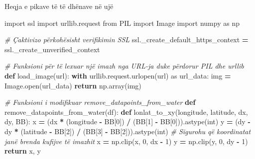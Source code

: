 \documentclass[
  ignorenonframetext,
]{beamer}
\newenvironment{Shaded}{\begin{snugshade}}{\end{snugshade}}
\newcommand{\BuiltInTok}[1]{#1}
\newcommand{\CommentTok}[1]{\textcolor[rgb]{0.56,0.35,0.01}{\textit{#1}}}
\newcommand{\ControlFlowTok}[1]{\textcolor[rgb]{0.13,0.29,0.53}{\textbf{#1}}}
\newcommand{\DecValTok}[1]{\textcolor[rgb]{0.00,0.00,0.81}{#1}}
\newcommand{\ImportTok}[1]{#1}
\newcommand{\KeywordTok}[1]{\textcolor[rgb]{0.13,0.29,0.53}{\textbf{#1}}}
\newcommand{\NormalTok}[1]{#1}
\newcommand{\OperatorTok}[1]{\textcolor[rgb]{0.81,0.36,0.00}{\textbf{#1}}}
\begin{document}
\begin{frame}[fragile]{Heqja e pikave të të dhënave në ujë}
\protect\hypertarget{heqja-e-pikave-tuxeb-tuxeb-dhuxebnave-nuxeb-ujuxeb-9}{}

\begin{Shaded}
\begin{Highlighting}[]
\ImportTok{import}\NormalTok{ ssl}
\ImportTok{import}\NormalTok{ urllib.request}
\ImportTok{from}\NormalTok{ PIL }\ImportTok{import}\NormalTok{ Image}
\ImportTok{import}\NormalTok{ numpy }\ImportTok{as}\NormalTok{ np}

\CommentTok{\# Çaktivizo përkohësisht verifikimin SSL}
\NormalTok{ssl.\_create\_default\_https\_context }\OperatorTok{=}\NormalTok{ ssl.\_create\_unverified\_context}

\CommentTok{\# Funksioni për të lexuar një imazh nga URL{-}ja duke përdorur PIL dhe urllib}
\KeywordTok{def}\NormalTok{ load\_image(url):}
    \ControlFlowTok{with}\NormalTok{ urllib.request.urlopen(url) }\ImportTok{as}\NormalTok{ url\_data:}
\NormalTok{        img }\OperatorTok{=}\NormalTok{ Image.}\BuiltInTok{open}\NormalTok{(url\_data)}
        \ControlFlowTok{return}\NormalTok{ np.array(img)}

\CommentTok{\# Funksioni i modifikuar remove\_datapoints\_from\_water}
\KeywordTok{def}\NormalTok{ remove\_datapoints\_from\_water(df):}
    \KeywordTok{def}\NormalTok{ lonlat\_to\_xy(longitude, latitude, dx, dy, BB):}
\NormalTok{        x }\OperatorTok{=}\NormalTok{ (dx }\OperatorTok{*}\NormalTok{ (longitude }\OperatorTok{{-}}\NormalTok{ BB[}\DecValTok{0}\NormalTok{]) }\OperatorTok{/}\NormalTok{ (BB[}\DecValTok{1}\NormalTok{] }\OperatorTok{{-}}\NormalTok{ BB[}\DecValTok{0}\NormalTok{])).astype(}\BuiltInTok{int}\NormalTok{)}
\NormalTok{        y }\OperatorTok{=}\NormalTok{ (dy }\OperatorTok{{-}}\NormalTok{ dy }\OperatorTok{*}\NormalTok{ (latitude }\OperatorTok{{-}}\NormalTok{ BB[}\DecValTok{2}\NormalTok{]) }\OperatorTok{/}\NormalTok{ (BB[}\DecValTok{3}\NormalTok{] }\OperatorTok{{-}}\NormalTok{ BB[}\DecValTok{2}\NormalTok{])).astype(}\BuiltInTok{int}\NormalTok{)}
        \CommentTok{\# Sigurohu që koordinatat janë brenda kufijve të imazhit}
\NormalTok{        x }\OperatorTok{=}\NormalTok{ np.clip(x, }\DecValTok{0}\NormalTok{, dx }\OperatorTok{{-}} \DecValTok{1}\NormalTok{)}
\NormalTok{        y }\OperatorTok{=}\NormalTok{ np.clip(y, }\DecValTok{0}\NormalTok{, dy }\OperatorTok{{-}} \DecValTok{1}\NormalTok{)}
        \ControlFlowTok{return}\NormalTok{ x, y}
\end{Highlighting}
\end{Shaded}
\end{frame}
\end{document}

